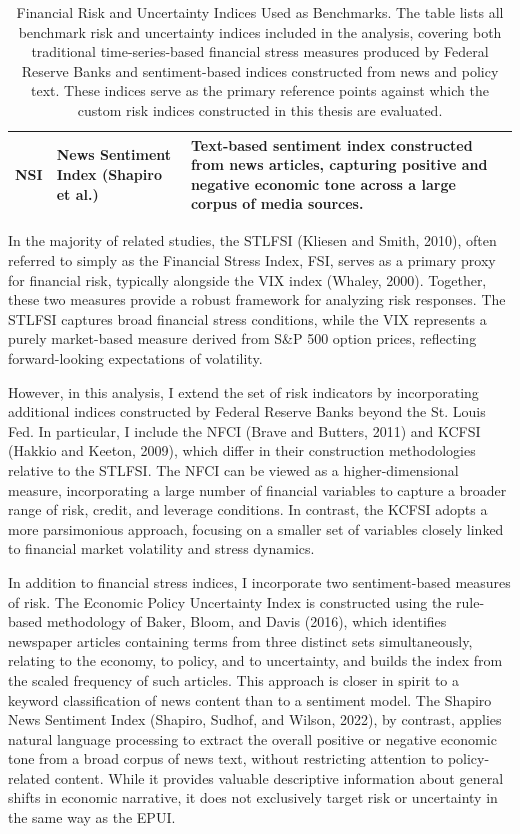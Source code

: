 \documentclass[12pt,a4paper]{report}
\begin{document}
\begin{table}[H]
\begin{tabularx}{\textwidth}{p{2.5cm} p{6.5cm} X}
NSI & News Sentiment Index (Shapiro et al.) 
& Text-based sentiment index constructed from news articles, capturing positive and negative economic tone across a large corpus of media sources. \\

\hline
\end{tabularx}
\caption{Financial Risk and Uncertainty Indices Used as Benchmarks. The table lists all benchmark risk and uncertainty indices included in the analysis, covering both traditional time-series-based financial stress measures produced by Federal Reserve Banks and sentiment-based indices constructed from news and policy text. These indices serve as the primary reference points against which the custom risk indices constructed in this thesis are evaluated.}

\end{table} 


In the majority of related studies, the STLFSI (Kliesen and Smith, 2010), often referred to 
simply as the Financial Stress Index, FSI, serves as a primary proxy for financial risk, 
typically alongside the VIX index (Whaley, 2000). Together, these two measures provide a 
robust framework for analyzing risk responses. The STLFSI captures broad financial stress 
conditions, while the VIX represents a purely market-based measure derived from S\&P 500 
option prices, reflecting forward-looking expectations of volatility.

However, in this analysis, I extend the set of risk indicators by incorporating additional 
indices constructed by Federal Reserve Banks beyond the St. Louis Fed. In particular, I 
include the NFCI (Brave and Butters, 2011) and KCFSI (Hakkio and Keeton, 2009), which 
differ in their construction methodologies relative to the STLFSI. The NFCI can be viewed 
as a higher-dimensional measure, incorporating a large number of financial variables to 
capture a broader range of risk, credit, and leverage conditions. In contrast, the KCFSI 
adopts a more parsimonious approach, focusing on a smaller set of variables closely linked 
to financial market volatility and stress dynamics.

In addition to financial stress indices, I incorporate two sentiment-based measures of risk. 
The Economic Policy Uncertainty Index is constructed using the rule-based methodology of 
Baker, Bloom, and Davis (2016), which identifies newspaper articles containing terms from 
three distinct sets simultaneously, relating to the economy, to policy, and to uncertainty, 
and builds the index from the scaled frequency of such articles. This approach is closer in 
spirit to a keyword classification of news content than to a sentiment model. The Shapiro 
News Sentiment Index (Shapiro, Sudhof, and Wilson, 2022), by contrast, applies natural 
language processing to extract the overall positive or negative economic tone from a broad 
corpus of news text, without restricting attention to policy-related content. While it 
provides valuable descriptive information about general shifts in economic narrative, it does 
not exclusively target risk or uncertainty in the same way as the EPUI.
\end{document}
